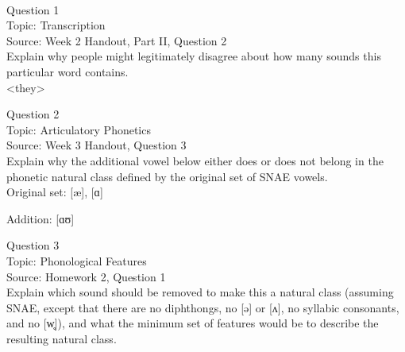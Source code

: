 \documentclass[12pt]{article}
\begin{document}
\newpage

\begin{center}
\textbf{{\color{red}{\HUGE END OF EXAM}}}\\

\end{center}
\newpage

\begin{center}
\textbf{{\color{blue}{\HUGE START OF EXAM\\}}}

\textbf{{\color{blue}{\HUGE Student ID: 43119\\}}}

\textbf{{\color{blue}{\HUGE \\}}}

\end{center}
\newpage

{\large Question 1}\\

Topic: Transcription\\
Source: Week 2 Handout, Part II, Question 2\\

Explain why people might legitimately disagree about how many sounds this particular word contains.\\

<they>


\newpage

{\large Question 2}\\

Topic: Articulatory Phonetics\\
Source: Week 3 Handout, Question 3\\

Explain why the additional vowel below either does or does not belong in the phonetic natural class defined by the original set of SNAE vowels.\\

Original set: {[æ]}, {[ɑ]}

Addition: {[ɑʊ]}


\newpage

{\large Question 3}\\

Topic: Phonological Features\\
Source: Homework 2, Question 1\\

Explain which sound should be removed to make this a natural class (assuming SNAE, except that there are no diphthongs, no [ə] or [ʌ], no syllabic consonants, and no [w̥]), and what the minimum set of features would be to describe the resulting natural class.\\
\end{document}

